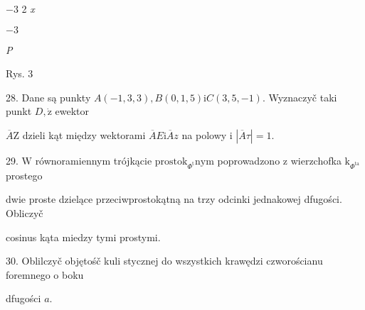 \documentclass[a4paper,12pt]{article}
\begin{document}
$-3$ 2  {\it x}

$-3$

{\it P}

Rys. 3

28. Dane są punkty $A(-1,3,3), B(0,1,5)\mathrm{i}C(3,5,-1)$. Wyznaczyč taki punkt $D, \dot{\mathrm{z}}$ ewektor

$\overline{A}\mathrm{Z}$ dzieli kąt między wektorami $\overline{A}E\mathrm{i}\overline{A}z$ na polowy i $|\overline{A}\tau|=1.$

29. $\mathrm{W}$ równoramiennym trójkącie $\mathrm{p}\mathrm{r}\mathrm{o}\mathrm{s}\mathrm{t}\mathrm{o}\mathrm{k}_{\Phi^{\mathrm{t}}}\mathrm{n}\mathrm{y}\mathrm{m}$ poprowadzono z wierzchofka $\mathrm{k}_{\Phi^{\mathrm{t}\mathrm{a}}}$ prostego

dwie proste dzielące przeciwprostokątną na trzy odcinki jednakowej dfugości. Obliczyč

cosinus kąta miedzy tymi prostymi.

30. Oblilczyč objętośč kuli stycznej do wszystkich krawędzi czworościanu foremnego o boku

dfugości $a.$
\end{document}
